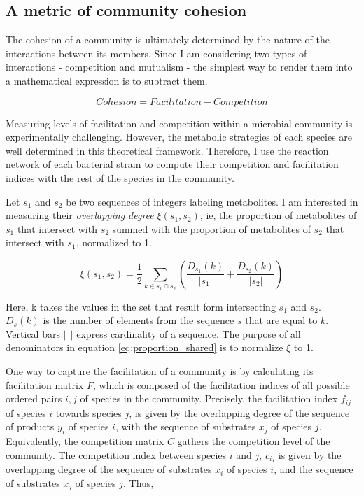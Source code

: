 \documentclass[titlepage,11pt]{article}
\begin{document}
\begin{linenumbers}
				\subsection{A metric of community cohesion}\label{subsec:cohesion_metric}
					\hspace{15pt}The cohesion of a community is ultimately determined by the nature of the interactions between its members. Since I am considering two types of interactions - competition and mutualism - the simplest way to render them into a mathematical expression is to subtract them.
					\begin{linenomath*}
						\begin{equation}\label{eq:cohesion_idea}
							Cohesion = Facilitation - Competition
						\end{equation}
					\end{linenomath*}
					Measuring levels of facilitation and competition within a microbial community is experimentally challenging. However, the metabolic strategies of each species are well determined in this theoretical framework. Therefore, I use the reaction network of each bacterial strain to compute their competition and facilitation indices with the rest of the species in the community.\par 
					Let $ s_1 $ and $ s_2 $ be two sequences of integers labeling metabolites. I am interested in measuring  their \textit{overlapping degree} $ \xi(s_1, s_2) $, ie, the proportion of metabolites of $ s_1 $ that intersect with $ s_2 $ summed with the proportion of metabolites of $ s_2 $ that intersect with $ s_1 $, normalized to 1.
					\begin{linenomath*}	
						\begin{equation}\label{eq:proportion_shared}
							\xi (s_1, s_2) = \frac {1}{2} \sum_{k \in s_1 \cap s_2} \left(\frac{D_{s_1}(k)}{|s_1|} + \frac{D_{s_2}(k)}{|s_2|}\right)
						\end{equation}
					\end{linenomath*}	
					Here, k takes the values in the set that result form intersecting $ s_1 $ and $ s_2 $. $ D_s(k) $ is the number of elements from the sequence $ s $ that are equal to $ k $. Vertical bars $  | \ \ | $ express cardinality of a sequence. The purpose of all denominators in equation \ref{eq:proportion_shared} is to normalize $ \xi $ to 1.\par
					One way to capture the facilitation of a community is by calculating its facilitation matrix $ F $, which is composed of the facilitation indices of all possible ordered pairs $ i, j $ of species in the community. Precisely, the facilitation index $ f_{ij} $ of species $ i $ towards species $ j $, is given by the overlapping degree of the sequence of products $ y_i $ of species $ i $,  with the sequence of substrates $ x_j $ of species $ j $. Equivalently, the competition matrix $ C $ gathers the competition level of the community. The competition index between species $ i $ and $ j $,  $ c_{ij} $  is given by the overlapping degree of the sequence of substrates $ x_i $ of species $ i $,  and the sequence of substrates $ x_j $ of species $ j $. Thus, 

\end{linenumbers}
\end{document}
